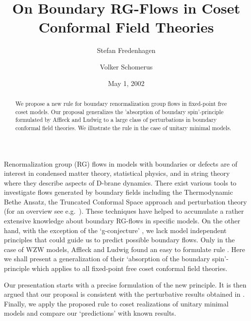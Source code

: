 \documentclass[a4paper,prd,twocolumn,nobibnotes,amssymb,preprintnumbers]{revtex4}
\begin{document}
\title{On Boundary RG-Flows in Coset Conformal Field Theories}
\author{Stefan Fredenhagen}
\author{Volker Schomerus}
\date{May 1, 2002}
\begin{abstract}
We propose a new rule for boundary renormalization group flows 
in fixed-point free coset models. Our proposal generalizes 
the 'absorption of boundary spin'-principle formulated by 
Affleck and Ludwig to a large class of perturbations in boundary 
conformal field theories. We illustrate the rule in the case
of unitary minimal models. 
\end{abstract}
\maketitle
Renormalization group (RG) flows in models with boundaries or 
defects are of interest in condensed matter theory, statistical 
physics, and in string theory where they describe aspects of 
D-brane dynamics. There exist various tools to investigate 
flows generated by boundary fields including the Thermodynamic 
Bethe Ansatz, the Truncated Conformal Space approach and 
perturbation theory (for an overview see e.g.\ 
\cite{Graham:2000si}). These techniques have helped to 
accumulate a rather extensive knowledge about boundary RG-flows 
in specific models. On the other hand, with the exception of the 
`g-conjecture' \cite{Affleck:1991tk}, we lack model independent 
principles that could guide us to predict possible boundary flows. 
Only in the case of WZW models, Affleck and Ludwig found an easy 
to formulate rule \cite{Affleck:1991by}. Here we shall present a 
generalization of their `absorption of the boundary spin'-principle 
which applies to all fixed-point free coset conformal field 
theories. 
\smallskip

Our presentation starts with a precise formulation of the new 
principle. It is then argued that our proposal is consistent 
with the perturbative results obtained in \cite{Fredenhagen:2001kw}. 
Finally, we apply the proposed rule to coset realizations of 
unitary minimal models and compare our `predictions' with  
known results. 
\medskip 
\end{document}
